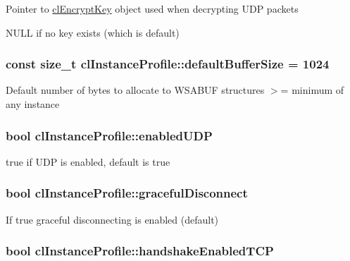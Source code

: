\label{classcl_instance_profile_ace072043f8984052fd263bcfecc73e4e}
Pointer to \hyperlink{classcl_encrypt_key}{clEncryptKey} object used when decrypting UDP packets \par
 NULL if no key exists (which is default) \hypertarget{classcl_instance_profile_a97c453f7fe529bd5a77d609fea65a539}{
\subsubsection[{defaultBufferSize}]{\setlength{\rightskip}{0pt plus 5cm}const size\_\-t {\bf clInstanceProfile::defaultBufferSize} = 1024}}
\label{classcl_instance_profile_a97c453f7fe529bd5a77d609fea65a539}
Default number of bytes to allocate to WSABUF structures  $>$= minimum of any instance \hypertarget{classcl_instance_profile_ad9d28cad949aec335b92f31d822d0bf6}{
\subsubsection[{enabledUDP}]{\setlength{\rightskip}{0pt plus 5cm}bool {\bf clInstanceProfile::enabledUDP}}}
\label{classcl_instance_profile_ad9d28cad949aec335b92f31d822d0bf6}
true if UDP is enabled, default is true \hypertarget{classcl_instance_profile_a05d0823b2bb852c4ba77c052ef27f250}{
\subsubsection[{gracefulDisconnect}]{\setlength{\rightskip}{0pt plus 5cm}bool {\bf clInstanceProfile::gracefulDisconnect}}}
\label{classcl_instance_profile_a05d0823b2bb852c4ba77c052ef27f250}
If true graceful disconnecting is enabled (default) \hypertarget{classcl_instance_profile_ab315c60cef677fc2ffafab78eeca2d52}{
\subsubsection[{handshakeEnabledTCP}]{\setlength{\rightskip}{0pt plus 5cm}bool {\bf clInstanceProfile::handshakeEnabledTCP}}}
